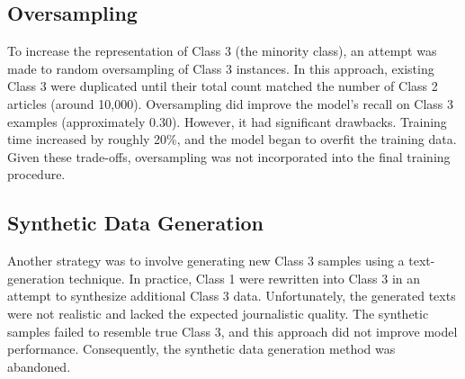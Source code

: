 \subsection{Oversampling}

To increase the representation of \ac{Class 3} (the minority class), an attempt was made to random oversampling of \ac{Class 3} instances. In this approach, existing \ac{Class 3} were duplicated until their total count matched the number of Class 2 articles (around 10,000). Oversampling did improve the model’s recall on \ac{Class 3} examples (approximately 0.30). However, it had significant drawbacks. Training time increased by roughly 20\%, and the model began to overfit the training data. Given these trade-offs, oversampling was not incorporated into the final training procedure.

\subsection{Synthetic Data Generation}

Another strategy was to involve generating new \ac{Class 3} samples using a text-generation technique. In practice, \ac{Class 1} were rewritten into \ac{Class 3} in an attempt to synthesize additional \ac{Class 3} data. Unfortunately, the generated texts were not realistic and lacked the expected journalistic quality. The synthetic samples failed to resemble true \ac{Class 3}, and this approach did not improve model performance. Consequently, the synthetic data generation method was abandoned.